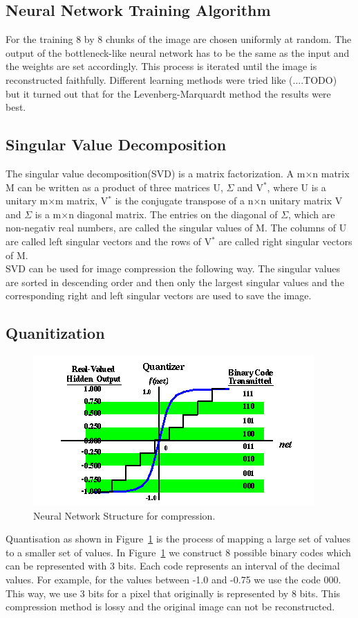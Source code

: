 \subsection{Neural Network Training Algorithm}
For the training 8 by 8 chunks of the image are chosen uniformly at random. The output of the bottleneck-like neural network has to be the same as the input and the weights are set accordingly. This process is iterated until the image is reconstructed faithfully.  
Different learning methods were tried like (....TODO) but it turned out that for the Levenberg-Marquardt method the results were best. 
\subsection{Singular Value Decomposition}
The singular value decomposition(SVD) is a matrix factorization. A m$\times$n matrix M can be written as a product of three matrices U, $\Sigma$ and V$^*$, where U is a unitary m$\times$m matrix, V$^*$ is the conjugate transpose of a n$\times$n unitary matrix V and $\Sigma$ is a m$\times$n diagonal matrix. The entries on the diagonal of $\Sigma$, which are non-negativ real numbers, are called the singular values of M. The columns of U are called left singular vectors and the rows of V$^*$ are called right singular vectors of M. \\
SVD can be used for image compression the following way. The singular values are sorted in descending order and then only the largest singular values and the corresponding right and left singular vectors are used to save the image.

\subsection{Quanitization}
\label{sec:quanitization}
\begin{figure}[tbp]
  \centering
  \includegraphics[width=\columnwidth]{bpQuantizer}
  \caption{Neural Network Structure for compression.}
  \label{fig:bpQuantizer}
\end{figure}

Quantisation as shown in Figure~\ref{fig:bpQuantizer} is the process of mapping a large set of values to a smaller set of values. In Figure~\ref{fig:bpQuantizer} we construct 8 possible binary codes which can be represented with 3 bits. Each code represents an interval of the decimal values. For example, for the values between -1.0 and -0.75 we use the code 000. This way, we use 3 bits for a pixel that originally is represented by 8 bits. This compression method is lossy and the original image can not be reconstructed. 
